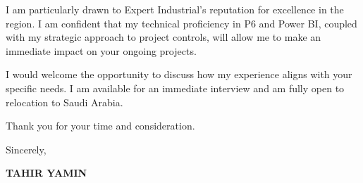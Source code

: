 \documentclass[11pt,a4paper]{article}
\begin{document}
I am particularly drawn to Expert Industrial's reputation for excellence in the region. I am confident that my technical proficiency in P6 and Power BI, coupled with my strategic approach to project controls, will allow me to make an immediate impact on your ongoing projects.

I would welcome the opportunity to discuss how my experience aligns with your specific needs. I am available for an immediate interview and am fully open to relocation to Saudi Arabia.

Thank you for your time and consideration.

\vspace{0.5cm}
Sincerely,

\vspace{0.5cm}
\textbf{TAHIR YAMIN}
\end{document}
